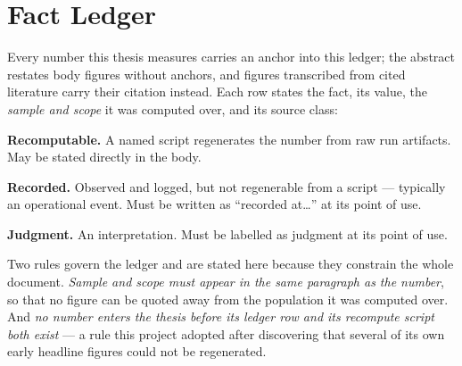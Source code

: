 \chapter{Fact Ledger}
\label{app:ledger}

Every number this thesis measures carries an \F{} anchor into this
ledger; the abstract restates body figures without anchors, and figures
transcribed from cited literature carry their citation instead. Each
row states the fact, its value, the \emph{sample and scope} it was computed
over, and its source class:

\begin{description}[leftmargin=3em,style=nextline]
  \item[\textnormal{\cls{A}}] \textbf{Recomputable.} A named script
        regenerates the number from raw run artifacts. May be stated
        directly in the body.
  \item[\textnormal{\cls{B}}] \textbf{Recorded.} Observed and logged, but
        not regenerable from a script --- typically an operational event.
        Must be written as ``recorded at\ldots'' at its point of use.
  \item[\textnormal{\cls{C}}] \textbf{Judgment.} An interpretation. Must be
        labelled as judgment at its point of use.
\end{description}

Two rules govern the ledger and are stated here because they constrain the
whole document. \emph{Sample and scope must appear in the same paragraph as
the number}, so that no figure can be quoted away from the population it
was computed over. And \emph{no number enters the thesis before its ledger
row and its recompute script both exist} --- a rule this project adopted
after discovering that several of its own early headline figures could not
be regenerated.

